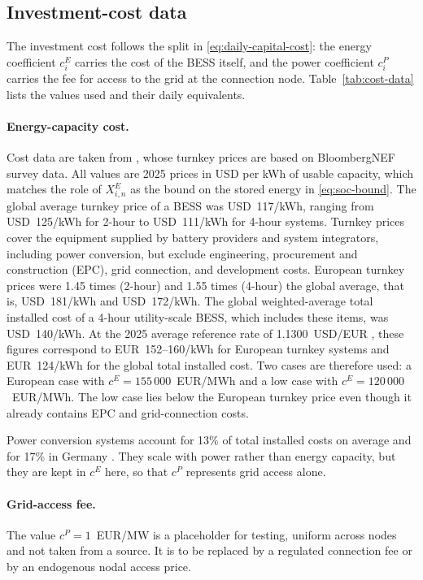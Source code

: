 \documentclass[11pt,a4paper,fleqn]{article}
\numberwithin{equation}{section}
\begin{document}
\subsection{Investment-cost data}
\label{sec:cost-data}

The investment cost follows the split in \eqref{eq:daily-capital-cost}: the
energy coefficient $c_i^E$ carries the cost of the BESS itself, and the power
coefficient $c_i^P$ carries the fee for access to the grid at the connection
node. Table~\ref{tab:cost-data} lists the values used and their daily
equivalents.

\paragraph{Energy-capacity cost.}
Cost data are taken from \textcite{IRENA2026costs}, whose turnkey prices are
based on BloombergNEF survey data. All values are 2025 prices in USD per kWh
of usable capacity, which matches the role of $X^E_{i,n}$ as the bound on the
stored energy in \eqref{eq:soc-bound}. The global average turnkey price of a
BESS was USD~117/kWh, ranging from USD~125/kWh for 2-hour to USD~111/kWh for
4-hour systems. Turnkey prices cover the equipment supplied by battery
providers and system integrators, including power conversion, but exclude
engineering, procurement and construction (EPC), grid connection, and
development costs. European turnkey prices were 1.45 times (2-hour) and 1.55
times (4-hour) the global average, that is, USD~181/kWh and USD~172/kWh. The
global weighted-average total installed cost of a 4-hour utility-scale BESS,
which includes these items, was USD~140/kWh. At the 2025 average reference
rate of 1.1300~USD/EUR \parencite{ECB2026exr}, these figures correspond to
EUR~152--160/kWh for European turnkey systems and EUR~124/kWh for the global
total installed cost. Two cases are therefore used: a European case with
$c^E=155\,000$~EUR/MWh and a low case with $c^E=120\,000$~EUR/MWh. The low
case lies below the European turnkey price even though it already contains
EPC and grid-connection costs.

Power conversion systems account for 13\% of total installed costs on
average and for 17\% in Germany \parencite{IRENA2026costs}. They scale with
power rather than energy capacity, but they are kept in $c^E$ here, so that
$c^P$ represents grid access alone.

\paragraph{Grid-access fee.}
The value $c^P=1$~EUR/MW is a placeholder for testing, uniform across nodes
and not taken from a source. It is to be replaced by a regulated connection
fee or by an endogenous nodal access price.
\end{document}
